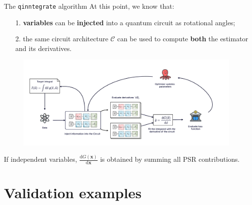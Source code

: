 \documentclass[8pt, xcolor={svgnames}, hyperref={linkcolor=black}]{beamer}
\begin{document}
\begin{frame}{The \texttt{qinntegrate} algorithm}
At this point, we know that:
\pause
\begin{itemize}[noitemsep]
\item[1.] \textbf{variables} can be \textbf{injected} into a quantum circuit as rotational angles;
\pause
\item[2.] the same circuit architecture $\mathcal{C}$ can be used to compute \textbf{both} the estimator 
and its derivatives.
\pause
\vspace{-0.4cm}
\end{itemize}
\begin{figure}  
    \includegraphics[width=1\textwidth]{figures/qinntegrate.pdf}
\end{figure}
If independent variables, $\frac{\text{d}G(\bm{x})}{\text{d}\bm{x}}$ 
is obtained by summing all PSR contributions.
\end{frame}

\section{Validation examples}
\end{document}
